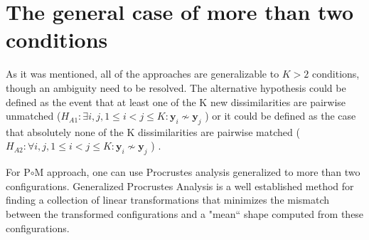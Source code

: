 \documentclass[11pt]{article} %
\begin{document}
\section{The general case of more than two conditions}


As it was mentioned, all of the approaches are generalizable to $K>2$ conditions, though an ambiguity need to be resolved. The alternative hypothesis could be  defined as the event that at least one of the K new dissimilarities are pairwise unmatched ($ H_{A1}: \exists i, j , 1\leq i < j \leq K :\bm{y}_{i} \nsim \bm{y}_{j} $ ) or it could be defined as the case that absolutely none of the K dissimilarities are pairwise matched   ($H_{A2}: \forall i, j , 1\leq i < j \leq K :\bm{y}_{i} \nsim \bm{y}_{j}$ )  .

For P$\circ$M approach, one can use Procrustes analysis  generalized to more than two configurations. Generalized Procrustes Analysis \cite{GPCA} is a well established method for finding a collection of linear transformations that minimizes the mismatch between the transformed configurations and a "mean`` shape computed from these configurations. 
\end{document}
